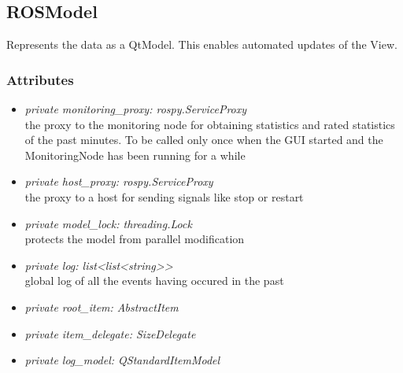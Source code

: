 \subsection{ROSModel}
Represents the data as a QtModel. This enables automated updates of the View.
\subsubsection{Attributes}
\begin{itemize}
  \item \textit{private monitoring\_proxy: rospy.ServiceProxy}\\ 
  the proxy to the monitoring node for obtaining statistics and rated statistics of the past minutes. To be called only once when the GUI started and the MonitoringNode has been running for a while
  \item \textit{private host\_proxy: rospy.ServiceProxy}\\ 
  the proxy to a host for sending signals like stop or restart
  \item \textit{private model\_lock: threading.Lock}\\ 
  protects the model from parallel modification
  \item \textit{private log: list<list<string>>}\\ 
  global log of all the events having occured in the past  
  \item \textit{private root\_item: AbstractItem}\\
  
  \item \textit{private item\_delegate: SizeDelegate}\\
  
  \item \textit{private log\_model: QStandardItemModel}\\
   
\end{itemize}
